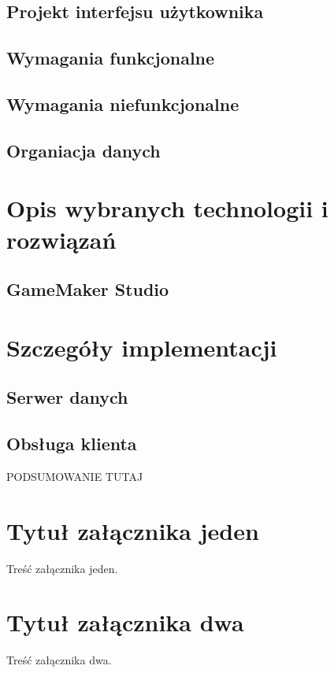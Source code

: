 \documentclass[openright]{xmgr}
\begin{document}
\section{Projekt interfejsu użytkownika}
\section{Wymagania funkcjonalne}
\section{Wymagania niefunkcjonalne}
\section{Organiacja danych}

\chapter{Opis wybranych technologii i rozwiązań}

\section{GameMaker Studio}

\chapter{Szczegóły implementacji}
 
\section{Serwer danych}
\section{Obsługa klienta}



\summary

PODSUMOWANIE TUTAJ

\appendix
\chapter{Tytuł załącznika jeden}

Treść załącznika jeden.

\chapter{Tytuł załącznika dwa}

Treść załącznika dwa.




\listoftables

\listoffigures

\oswiadczenie
\end{document}

